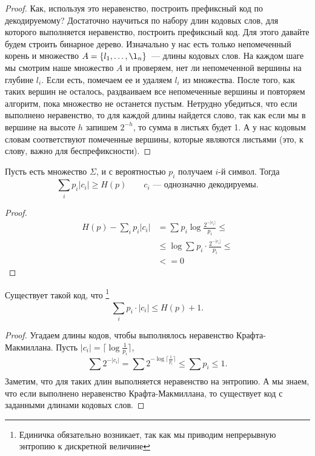 \begin{proof}
	Как, используя это неравенство, построить префиксный код по декодируемому? Достаточно научиться по набору длин кодовых слов, для которого выполняется неравенство, построить префиксный код. Для этого давайте будем строить бинарное дерево. Изначально у нас есть только непомеченный корень и множество $A = \{l_1, \dots, \l_n\}$~--- длины кодовых слов. На каждом шаге мы смотрим наше множество $A$ и проверяем, нет ли непомеченной вершины на глубине $l_i$. Если есть, помечаем ее и удаляем $l_i$ из множества. После того, как таких вершин не осталось, раздваиваем все непомеченные вершины и повторяем алгоритм, пока множество не останется пустым. Нетрудно убедиться, что если выполнено неравенство, то для каждой длины найдется слово, так как если мы в вершине на высоте $h$ запишем $2^{-h}$, то сумма в листьях будет 1. А у нас кодовым словам соответствуют помеченные вершины, которые являются листьями (это, к слову, важно для беспрефиксности).
\end{proof}


\begin{thm}[Шеннон]
Пусть есть множество $ \Sigma $, и с вероятностью $ p_i$ получаем  $ i$-й символ.
   Тогда
   \[
	   \sum_{i}^{} p_i \lvert c_i \rvert  \ge H(p) \qquad  c_i \text{ --- однозначно декодируемы}
   .\] 
\end{thm}
\begin{proof}
	\begin{align*}
		H(p) - \sum_{i}^{} p_i \lvert c_i \rvert &= \sum_{}^{} p_i \log \frac{2^{-\lvert c_i \rvert }}{p_i} \le \tag{Неравенство Йенсена}\\
												 & \le  \log \sum_{}^{} p_i \cdot \frac{2^{-\lvert c_i \rvert }}{p_i} \le \tag{Неравенство Крафта} \\
												 & <= 0
	\end{align*}
\end{proof}


\begin{thm}[Шеннон]
	Существует такой код, что \footnote{Единичка обязательно возникает, так как мы приводим непрерывную энтропию к дискретной величине}
	\[
		\sum_{i}^{} p_i \cdot \lvert c_i \rvert \le H(p) + 1
	.\] 
\end{thm}
\begin{proof}
    Угадаем длины кодов, чтобы выполнялось неравенство Крафта-Макмиллана.
	Пусть $  \lvert c_i \rvert = \lceil \log \frac{1}{p_i} \rceil$,
	\[
		\sum_{}^{} 2^{- \lvert c_i \rvert } = \sum_{}^{} 2^{- \log \lceil \frac{1}{p_i} \rceil} \le \sum_{}^{} p_i \le 1
	.\] 
	Заметим, что для таких длин выполняется неравенство на энтропию. А мы знаем, что если выполнено неравенство Крафта-Макмиллана, то существует код с заданными длинами кодовых слов.
\end{proof}

